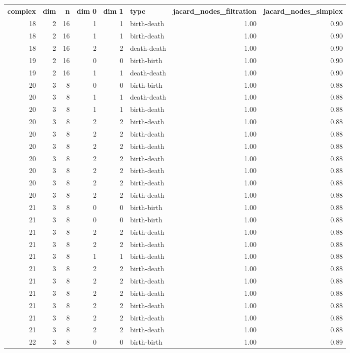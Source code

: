 \documentclass{article}
\begin{document}
\begin{center}
\begin{tabular}{rrrrrlrr}
\toprule
complex & dim & n & dim 0 & dim 1 & type & jacard\_nodes\_filtration & jacard\_nodes\_simplex \\
\midrule
18 & 2 & 16 & 1 & 1 & birth-death & 1.00 & 0.90 \\
18 & 2 & 16 & 1 & 1 & birth-death & 1.00 & 0.90 \\
18 & 2 & 16 & 2 & 2 & death-death & 1.00 & 0.90 \\
19 & 2 & 16 & 0 & 0 & birth-birth & 1.00 & 0.90 \\
19 & 2 & 16 & 1 & 1 & death-death & 1.00 & 0.90 \\
20 & 3 & 8 & 0 & 0 & birth-birth & 1.00 & 0.88 \\
20 & 3 & 8 & 1 & 1 & death-death & 1.00 & 0.88 \\
20 & 3 & 8 & 1 & 1 & birth-death & 1.00 & 0.88 \\
20 & 3 & 8 & 2 & 2 & birth-death & 1.00 & 0.88 \\
20 & 3 & 8 & 2 & 2 & birth-death & 1.00 & 0.88 \\
20 & 3 & 8 & 2 & 2 & birth-death & 1.00 & 0.88 \\
20 & 3 & 8 & 2 & 2 & birth-death & 1.00 & 0.88 \\
20 & 3 & 8 & 2 & 2 & birth-death & 1.00 & 0.88 \\
20 & 3 & 8 & 2 & 2 & birth-death & 1.00 & 0.88 \\
20 & 3 & 8 & 2 & 2 & birth-death & 1.00 & 0.88 \\
21 & 3 & 8 & 0 & 0 & birth-birth & 1.00 & 0.88 \\
21 & 3 & 8 & 0 & 0 & birth-birth & 1.00 & 0.88 \\
21 & 3 & 8 & 2 & 2 & birth-death & 1.00 & 0.88 \\
21 & 3 & 8 & 2 & 2 & birth-death & 1.00 & 0.88 \\
21 & 3 & 8 & 1 & 1 & birth-death & 1.00 & 0.88 \\
21 & 3 & 8 & 2 & 2 & birth-death & 1.00 & 0.88 \\
21 & 3 & 8 & 2 & 2 & birth-death & 1.00 & 0.88 \\
21 & 3 & 8 & 2 & 2 & birth-death & 1.00 & 0.88 \\
21 & 3 & 8 & 2 & 2 & birth-death & 1.00 & 0.88 \\
21 & 3 & 8 & 2 & 2 & birth-death & 1.00 & 0.88 \\
21 & 3 & 8 & 2 & 2 & birth-death & 1.00 & 0.88 \\
22 & 3 & 8 & 0 & 0 & birth-birth & 1.00 & 0.89 \\

\end{tabular}
\end{center}
\end{document}
